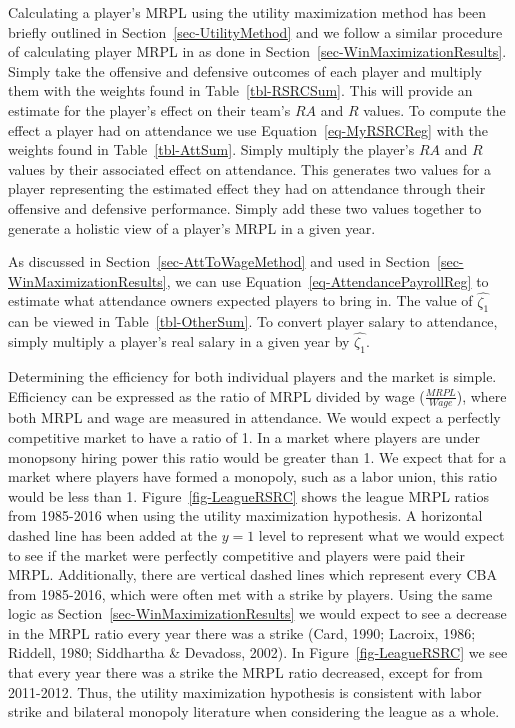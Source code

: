 \documentclass[
  12pt,
  letterpaper,
  DIV=11,
  numbers=noendperiod]{scrartcl}
\begin{document}
Calculating a player's MRPL using the utility maximization method has
been briefly outlined in Section~\ref{sec-UtilityMethod} and we follow a
similar procedure of calculating player MRPL in as done in
Section~\ref{sec-WinMaximizationResults}. Simply take the offensive and
defensive outcomes of each player and multiply them with the weights
found in Table~\ref{tbl-RSRCSum}. This will provide an estimate for the
player's effect on their team's \(RA\) and \(R\) values. To compute the
effect a player had on attendance we use Equation~\ref{eq-MyRSRCReg}
with the weights found in Table~\ref{tbl-AttSum}. Simply multiply the
player's \(RA\) and \(R\) values by their associated effect on
attendance. This generates two values for a player representing the
estimated effect they had on attendance through their offensive and
defensive performance. Simply add these two values together to generate
a holistic view of a player's MRPL in a given year.

As discussed in Section~\ref{sec-AttToWageMethod} and used in
Section~\ref{sec-WinMaximizationResults}, we can use
Equation~\ref{eq-AttendancePayrollReg} to estimate what attendance
owners expected players to bring in. The value of \(\widehat{\zeta_1}\)
can be viewed in Table~\ref{tbl-OtherSum}. To convert player salary to
attendance, simply multiply a player's real salary in a given year by
\(\widehat{\zeta_1}\).

Determining the efficiency for both individual players and the market is
simple. Efficiency can be expressed as the ratio of MRPL divided by wage
(\(\frac{MRPL}{Wage}\)), where both MRPL and wage are measured in
attendance. We would expect a perfectly competitive market to have a
ratio of 1. In a market where players are under monopsony hiring power
this ratio would be greater than 1. We expect that for a market where
players have formed a monopoly, such as a labor union, this ratio would
be less than 1. Figure~\ref{fig-LeagueRSRC} shows the league MRPL ratios
from 1985-2016 when using the utility maximization hypothesis. A
horizontal dashed line has been added at the \(y=1\) level to represent
what we would expect to see if the market were perfectly competitive and
players were paid their MRPL. Additionally, there are vertical dashed
lines which represent every CBA from 1985-2016, which were often met
with a strike by players. Using the same logic as
Section~\ref{sec-WinMaximizationResults} we would expect to see a
decrease in the MRPL ratio every year there was a strike (Card, 1990;
Lacroix, 1986; Riddell, 1980; Siddhartha \& Devadoss, 2002). In
Figure~\ref{fig-LeagueRSRC} we see that every year there was a strike
the MRPL ratio decreased, except for from 2011-2012. Thus, the utility
maximization hypothesis is consistent with labor strike and bilateral
monopoly literature when considering the league as a whole.
\end{document}
